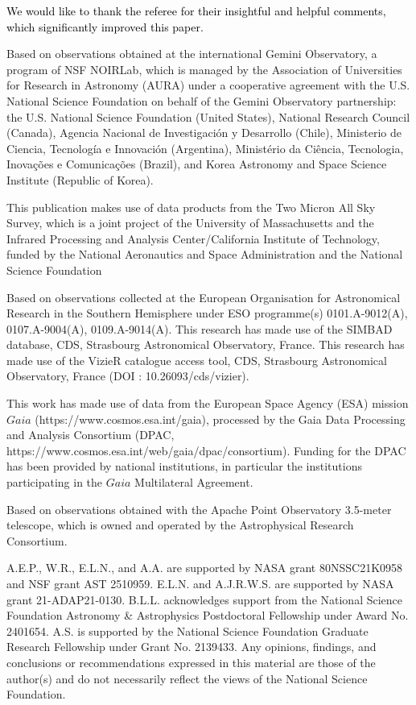 \documentclass[]{aastex701} %
\begin{document}
\begin{acknowledgments}

\textcolor{black}{We would like to thank the referee for their insightful and helpful comments, which significantly improved this paper.}

Based on observations obtained at the international Gemini Observatory, a program of NSF NOIRLab, which is managed by the Association of Universities for Research in Astronomy (AURA) under a cooperative agreement with the U.S. National Science Foundation on behalf of the Gemini Observatory partnership: the U.S. National Science Foundation (United States), National Research Council (Canada), Agencia Nacional de Investigación y Desarrollo (Chile), Ministerio de Ciencia, Tecnología e Innovación (Argentina), Ministério da Ciência, Tecnologia, Inovações e Comunicações (Brazil), and Korea Astronomy and Space Science Institute (Republic of Korea).

This publication makes use of data products from the Two Micron All Sky Survey, which is a joint project of the University of Massachusetts and the Infrared Processing and Analysis Center/California Institute of Technology, funded by the National Aeronautics and Space Administration and the National Science Foundation

Based on observations collected at the European Organisation for Astronomical Research in the Southern Hemisphere under ESO programme(s) 0101.A-9012(A), 0107.A-9004(A), 0109.A-9014(A). This research has made use of the SIMBAD database, CDS, Strasbourg Astronomical Observatory, France. This research has made use of the VizieR catalogue access tool, CDS, Strasbourg Astronomical Observatory, France (DOI : 10.26093/cds/vizier).

This work has made use of data from the European Space Agency (ESA) mission $Gaia$
(https://www.cosmos.esa.int/gaia), processed by the Gaia Data Processing and Analysis Consortium (DPAC, https://www.cosmos.esa.int/web/gaia/dpac/consortium). Funding for the DPAC has been
provided by national institutions, in particular the institutions participating in the $Gaia$ Multilateral Agreement.

Based on observations obtained with the Apache Point Observatory 3.5-meter telescope, which is owned and operated by the Astrophysical Research Consortium.

A.E.P., W.R., E.L.N., and A.A. are supported by NASA grant 80NSSC21K0958 and NSF grant AST 2510959. E.L.N. and A.J.R.W.S. are supported by NASA grant 21-ADAP21-0130. B.L.L. acknowledges support from the National Science Foundation Astronomy \& Astrophysics Postdoctoral Fellowship under Award No. 2401654. A.S. is supported by the National Science Foundation Graduate Research Fellowship under Grant No. 2139433. Any opinions, findings, and conclusions or recommendations expressed in this material are those of the author(s) and do not necessarily reflect the views of the National Science Foundation. 

\end{acknowledgments}
\end{document}
